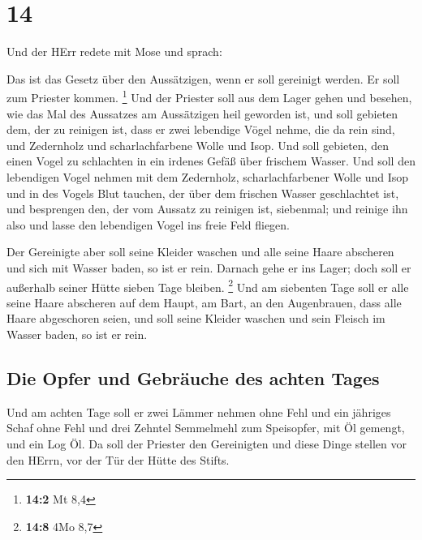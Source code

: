 \hypertarget{section-13}{%
\section{14}\label{section-13}}

 Und der HErr redete mit Mose und sprach:

 Das ist das Gesetz über den Aussätzigen, wenn er soll
gereinigt werden. Er soll zum Priester kommen. \footnote{\textbf{14:2}
  Mt 8,4}  Und der Priester soll aus dem Lager gehen und
besehen, wie das Mal des Aussatzes am Aussätzigen heil geworden ist,
 und soll gebieten dem, der zu reinigen ist, dass er zwei
lebendige Vögel nehme, die da rein sind, und Zedernholz und
scharlachfarbene Wolle und Isop.  Und soll gebieten, den
einen Vogel zu schlachten in ein irdenes Gefäß über frischem Wasser.
 Und soll den lebendigen Vogel nehmen mit dem Zedernholz,
scharlachfarbener Wolle und Isop und in des Vogels Blut tauchen, der
über dem frischen Wasser geschlachtet ist,  und besprengen
den, der vom Aussatz zu reinigen ist, siebenmal; und reinige ihn also
und lasse den lebendigen Vogel ins freie Feld fliegen.

 Der Gereinigte aber soll seine Kleider waschen und alle
seine Haare abscheren und sich mit Wasser baden, so ist er rein. Darnach
gehe er ins Lager; doch soll er außerhalb seiner Hütte sieben Tage
bleiben. \footnote{\textbf{14:8} 4Mo 8,7}  Und am
siebenten Tage soll er alle seine Haare abscheren auf dem Haupt, am
Bart, an den Augenbrauen, dass alle Haare abgeschoren seien, und soll
seine Kleider waschen und sein Fleisch im Wasser baden, so ist er rein.

\hypertarget{die-opfer-und-gebruxe4uche-des-achten-tages}{%
\subsection{Die Opfer und Gebräuche des achten
Tages}\label{die-opfer-und-gebruxe4uche-des-achten-tages}}

 Und am achten Tage soll er zwei Lämmer nehmen ohne Fehl
und ein jähriges Schaf ohne Fehl und drei Zehntel Semmelmehl zum
Speisopfer, mit Öl gemengt, und ein Log Öl.  Da soll der
Priester den Gereinigten und diese Dinge stellen vor den HErrn, vor der
Tür der Hütte des Stifts.

